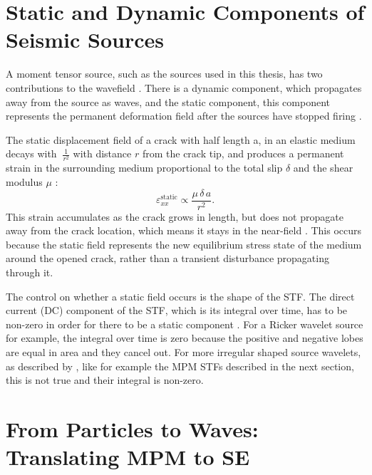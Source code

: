 \section{Static and Dynamic Components of Seismic Sources}
\label{sec:dc_static_theory}

A moment tensor source, such as the sources used in this thesis, has two contributions to the wavefield \parencite{kAkiRichards19801981}. There is a dynamic component, which propagates away from the source as waves, and the static component, this component represents the permanent deformation field after the sources have stopped firing \parencite{freundDynamicFractureMechanics1998,zhuNoteDynamicStatic2002,archambeauGeneralTheoryElastodynamic1968}. \par

The static displacement field of a crack with half length a, in an elastic medium decays with $\ \frac{1}{r^2}$ with distance $r$ from the crack tip, and produces a permanent strain in the surrounding medium proportional to the total slip $\delta$ and the shear modulus $\mu$ \parencite{freundDynamicFractureMechanics1990}:
\begin{equation}
    \varepsilon_{xx}^{\text{static}} \propto \frac{\mu\,\delta\,a}{r^2}.
\end{equation}  This strain accumulates as the crack grows in length, but does not propagate away from the crack location, which means it stays in the near-field \parencite{freundDynamicFractureMechanics1998}. This occurs because the static field represents the new equilibrium stress state of the medium around the opened crack, rather than a transient disturbance propagating through it. \par

The control on whether a static field occurs is the shape of the STF. The direct current (DC) component of the STF, which is its integral over time, has to be non-zero in order for there to be a static component \parencite{kAkiRichards19801981,zhuNoteDynamicStatic2002}. For a Ricker wavelet source for example, the integral over time is zero because the positive and negative lobes are equal in area and they cancel out. For more irregular shaped source wavelets, as described by \cite{kaganPointSourcesElastic1987,kAkiRichards19801981}, like for example the MPM STFs described in the next section, this is not true and their integral is non-zero. \par


\section{From Particles to Waves: Translating MPM to SE}
\label{sec:from_mpm_to_se}

